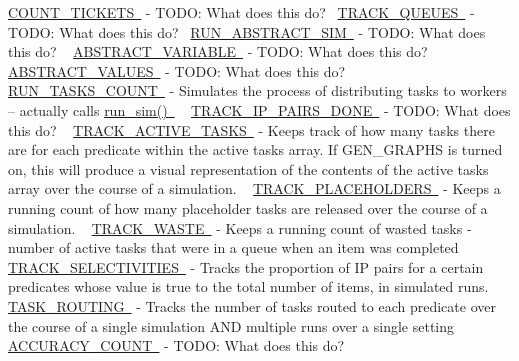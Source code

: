 \mbox{\hyperlink{}{C\+O\+U\+N\+T\+\_\+\+T\+I\+C\+K\+E\+TS }} -\/ T\+O\+DO\+: What does this do?~\newline
 \mbox{\hyperlink{}{T\+R\+A\+C\+K\+\_\+\+Q\+U\+E\+U\+ES }} -\/ T\+O\+DO\+: What does this do?~\newline
\mbox{\hyperlink{}{R\+U\+N\+\_\+\+A\+B\+S\+T\+R\+A\+C\+T\+\_\+\+S\+IM }} -\/ T\+O\+DO\+: What does this do? ~\newline
 \mbox{\hyperlink{}{A\+B\+S\+T\+R\+A\+C\+T\+\_\+\+V\+A\+R\+I\+A\+B\+LE }} -\/ T\+O\+DO\+: What does this do? ~\newline
 \mbox{\hyperlink{}{A\+B\+S\+T\+R\+A\+C\+T\+\_\+\+V\+A\+L\+U\+ES }} -\/ T\+O\+DO\+: What does this do? ~\newline
 \mbox{\hyperlink{}{R\+U\+N\+\_\+\+T\+A\+S\+K\+S\+\_\+\+C\+O\+U\+NT }} -\/ Simulates the process of distributing tasks to workers -- actually calls \mbox{\hyperlink{}{run\+\_\+sim() }} ~\newline
 \mbox{\hyperlink{}{T\+R\+A\+C\+K\+\_\+\+I\+P\+\_\+\+P\+A\+I\+R\+S\+\_\+\+D\+O\+NE }} -\/ T\+O\+DO\+: What does this do? ~\newline
 \mbox{\hyperlink{}{T\+R\+A\+C\+K\+\_\+\+A\+C\+T\+I\+V\+E\+\_\+\+T\+A\+S\+KS }} -\/ Keeps track of how many tasks there are for each predicate within the active tasks array. If G\+E\+N\+\_\+\+G\+R\+A\+P\+HS is turned on, this will produce a visual representation of the contents of the active tasks array over the course of a simulation. ~\newline
 \mbox{\hyperlink{}{T\+R\+A\+C\+K\+\_\+\+P\+L\+A\+C\+E\+H\+O\+L\+D\+E\+RS }} -\/ Keeps a running count of how many placeholder tasks are released over the course of a simulation. ~\newline
 \mbox{\hyperlink{}{T\+R\+A\+C\+K\+\_\+\+W\+A\+S\+TE }} -\/ Keeps a running count of wasted tasks -\/ number of active tasks that were in a queue when an item was completed ~\newline
 \mbox{\hyperlink{}{T\+R\+A\+C\+K\+\_\+\+S\+E\+L\+E\+C\+T\+I\+V\+I\+T\+I\+ES }} -\/ Tracks the proportion of IP pairs for a certain predicates whose value is true to the total number of items, in simulated runs. ~\newline
 \mbox{\hyperlink{}{T\+A\+S\+K\+\_\+\+R\+O\+U\+T\+I\+NG }} -\/ Tracks the number of tasks routed to each predicate over the course of a single simulation A\+ND multiple runs over a single setting ~\newline
 \mbox{\hyperlink{}{A\+C\+C\+U\+R\+A\+C\+Y\+\_\+\+C\+O\+U\+NT }} -\/ T\+O\+DO\+: What does this do? ~\newline
